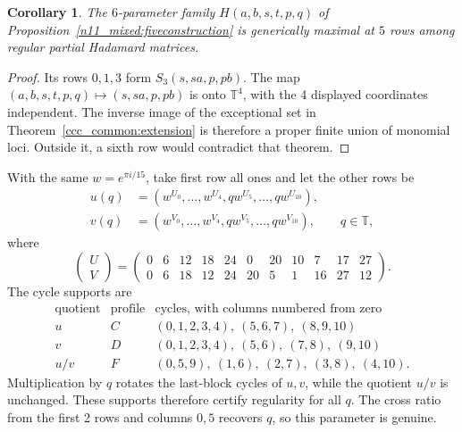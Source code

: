 \documentclass[11pt,a4paper]{article}
\newtheorem{corollary}[theorem]{Corollary}
\theoremstyle{plain}
\theoremstyle{definition}
\theoremstyle{plain}
\begin{document}
\par\addvspace{\medskipamount}\noindent
\begin{minipage}{\linewidth}
\begin{corollary}\label{ccc_common:mixedmax}
The $6$-parameter family $H(a,b,s,t,p,q)$ of Proposition~\ref{n11_mixed:fiveconstruction} is generically maximal at $5$ rows among regular partial Hadamard matrices.
\end{corollary}
\end{minipage}
\par\addvspace{\medskipamount}

\begin{proof}
Its rows $0,1,3$ form $S_3(s,sa,p,pb)$. The map $(a,b,s,t,p,q)\mapsto(s,sa,p,pb)$ is onto $\mathbb T^4$, with the 4 displayed coordinates independent. The inverse image of the exceptional set in Theorem~\ref{ccc_common:extension} is therefore a proper finite union of monomial loci. Outside it, a sixth row would contradict that theorem.
\end{proof}

\medskip
With the same $w=e^{\pi i/15}$, take first row all ones and let the other rows be
\[
\begin{aligned}
u(q)&=(w^{U_0},\ldots,w^{U_4}, qw^{U_5},\ldots,qw^{U_{10}}),\\
v(q)&=(w^{V_0},\ldots,w^{V_4}, qw^{V_5},\ldots,qw^{V_{10}}), \qquad q\in\mathbb{T},
\end{aligned}
\]
where
$$\begin{pmatrix}U\\ V\end{pmatrix}
=
\begin{pmatrix}
0&6&12&18&24&0&20&10&7&17&27\\
0&6&18&12&24&20&5&1&16&27&12
\end{pmatrix}.$$
The cycle supports are
$$\begin{array}{c|c|l}
\text{quotient}&\text{profile}&\text{cycles, with columns numbered from zero}\\ \hline
u&C&(0,1,2,3,4),\ (5,6,7),\ (8,9,10)\\
v&D&(0,1,2,3,4),\ (5,6),\ (7,8),\ (9,10)\\
u/v&F&(0,5,9),\ (1,6),\ (2,7),\ (3,8),\ (4,10).
\end{array}$$
Multiplication by $q$ rotates the last-block cycles of $u,v$, while the quotient $u/v$ is unchanged. These supports therefore certify regularity for all $q$. The cross ratio from the first 2 rows and columns $0,5$ recovers $q$, so this parameter is genuine.
\end{document}
